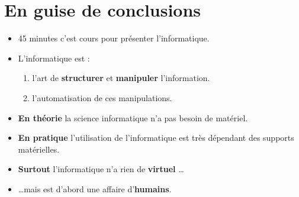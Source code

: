 \section[Conclusion]{En guise de conclusions}
\begin{frame}
	\begin{itemize}
		\item 45 minutes c'est cours pour présenter l'informatique.
		\item L'informatique est :
		\begin{enumerate}
			\item l'art de \textbf{structurer} et \textbf{manipuler} l'information.
			\item l'automatisation de ces manipulations.
		\end{enumerate}
		\item \textbf{En théorie} la science informatique n'a pas besoin de matériel.
		\item \textbf{En pratique} l'utilisation de l'informatique est très dépendant des supports matérielles.
		\item \textbf{Surtout} l'informatique n'a rien de \textbf{virtuel} \ldots
		\item \ldots mais est d'abord une affaire d'\textbf{humains}.
	\end{itemize}
\end{frame}